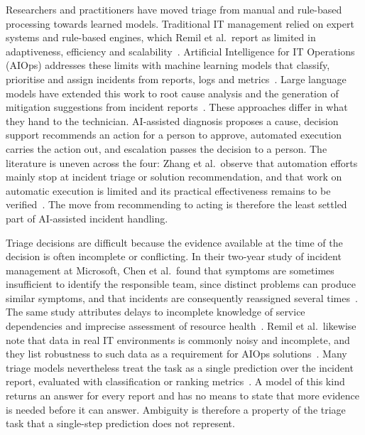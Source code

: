 \documentclass[12pt,a4paper]{article}
\begin{document}
Researchers and practitioners have moved triage from manual and rule-based processing towards learned models. Traditional IT management relied on expert systems and rule-based engines, which Remil et al.\ report as limited in adaptiveness, efficiency and scalability~\cite{remil2024}. Artificial Intelligence for IT Operations (AIOps) addresses these limits with machine learning models that classify, prioritise and assign incidents from reports, logs and metrics~\cite{chen2020,remil2024}. Large language models have extended this work to root cause analysis and the generation of mitigation suggestions from incident reports~\cite{zhang2025}. These approaches differ in what they hand to the technician. AI-assisted diagnosis proposes a cause, decision support recommends an action for a person to approve, automated execution carries the action out, and escalation passes the decision to a person. The literature is uneven across the four: Zhang et al.\ observe that automation efforts mainly stop at incident triage or solution recommendation, and that work on automatic execution is limited and its practical effectiveness remains to be verified~\cite{zhang2025}. The move from recommending to acting is therefore the least settled part of AI-assisted incident handling.

Triage decisions are difficult because the evidence available at the time of the decision is often incomplete or conflicting. In their two-year study of incident management at Microsoft, Chen et al.\ found that symptoms are sometimes insufficient to identify the responsible team, since distinct problems can produce similar symptoms, and that incidents are consequently reassigned several times~\cite{chen2020}. The same study attributes delays to incomplete knowledge of service dependencies and imprecise assessment of resource health~\cite{chen2020}. Remil et al.\ likewise note that data in real IT environments is commonly noisy and incomplete, and they list robustness to such data as a requirement for AIOps solutions~\cite{remil2024}. Many triage models nevertheless treat the task as a single prediction over the incident report, evaluated with classification or ranking metrics~\cite{remil2024}. A model of this kind returns an answer for every report and has no means to state that more evidence is needed before it can answer. Ambiguity is therefore a property of the triage task that a single-step prediction does not represent.
\end{document}

